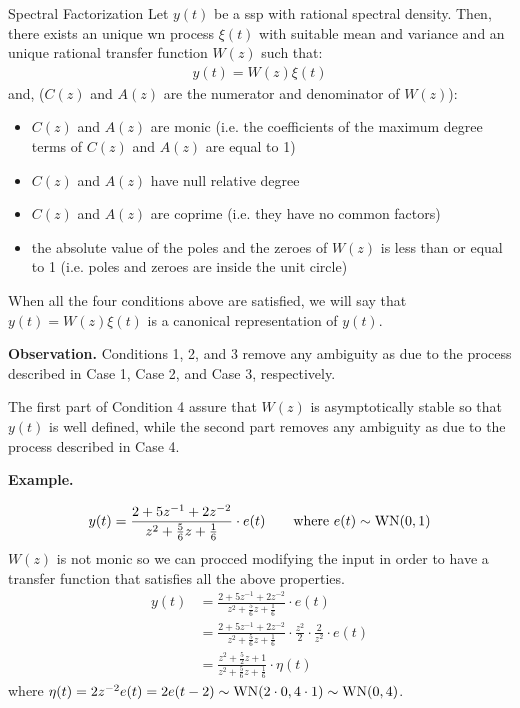 
\begin{theorem}{Spectral Factorization}
	Let $y(t)$ be a \gls{ssp} with rational spectral density. 
	Then, there exists an unique \gls{wn} process $\xi(t)$ with suitable mean and variance and an unique rational transfer function $W(z)$ such that:
	\begin{align*}
		y(t) = W(z)\xi(t)
	\end{align*}
    and, ($C(z)$ and $A(z)$ are the numerator and denominator of $W(z)$):
    \begin{itemize}
		\item $C(z)$ and $A(z)$ are monic (i.e. the coefficients of the maximum degree terms of $C(z)$ and $A(z)$ are equal to 1)
		\item $C(z)$ and $A(z)$ have null relative degree
		\item $C(z)$ and $A(z)$ are coprime (i.e. they have no common factors) 
		\item the absolute value of the poles and the zeroes of $W(z)$ is less than or equal to 1 (i.e. poles and zeroes are inside the unit circle)
    \end{itemize}
\end{theorem}

When all the four conditions above are satisfied, we will say that $y(t) = W(z)\xi(t)$ is a canonical representation of $y(t)$.

\textbf{Observation.} Conditions 1, 2, and 3 remove any ambiguity as due to the process described in Case 1, Case 2, and Case 3, respectively. 

The first part of Condition 4 assure that $W(z)$ is asymptotically stable so that $y(t)$ is well defined, while the second part removes any ambiguity as due to the process described in Case 4.

\textbf{Example.}

\begin{align*}
	y(t)=\frac{2+5z^{-1}+2z^{-2}}{z^2+\frac{5}{6}z+\frac{1}{6}}\cdot e(t)  \qquad \text{where } e(t)\sim \operatorname{WN}(0,1)
\end{align*}
$W(z)$ is not monic so we can procced modifying the input in order to have a transfer function that satisfies all the above properties.
\begin{align*}
	y(t)&=\frac{2+5z^{-1}+2z^{-2}}{z^2+\frac{5}{6}z+\frac{1}{6}}\cdot e(t) \\
	&=\frac{2+5z^{-1}+2z^{-2}}{z^2+\frac{5}{6}z+\frac{1}{6}}\cdot\frac{z^2}{2}\cdot\frac{2}{z^2}\cdot e(t)\\
	&=\frac{z^2+\frac{5}{2}z+1}{z^2+\frac{5}{6}z+\frac{1}{6}}\cdot \eta(t)
\end{align*}
where $\eta(t)=2z^{-2}e(t)=2e(t-2)\sim \operatorname{WN}(2\cdot0,4\cdot 1)\sim \operatorname{WN}(0,4)$.

